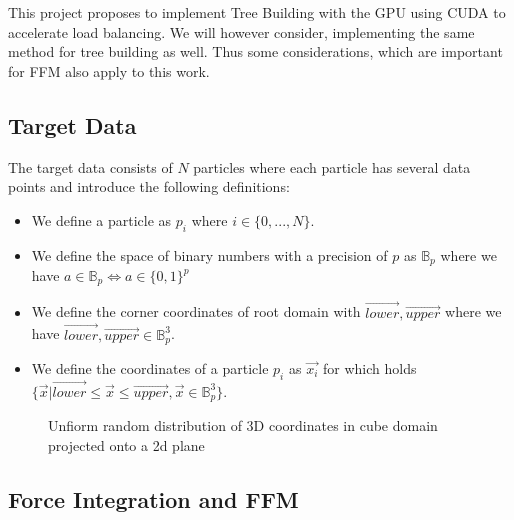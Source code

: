 \documentclass[]{article}
\begin{document}
This project proposes to implement Tree Building with the GPU using CUDA to accelerate load balancing. We will however consider, implementing the same method for tree building as well. Thus some considerations, which are important for FFM also apply to this work.

\subsection{Target Data}\label{section:target-data}


The target data consists of $N$ particles where each particle has several data points and introduce the following definitions:

\begin{itemize}
	\item We define a particle as $p_i$  where $i \in \{0,...,N\}$. 
	\item We define the space of binary numbers with a precision of $p$ as $\mathbb{B}_p$ where we have $a \in \mathbb{B}_p \Leftrightarrow a \in \{0,1\}^{p}$
	\item We define the corner coordinates of root domain with $\vec{lower}, \vec{upper}$ where we have $\vec{lower}, \vec{upper} \in \mathbb{B}_p^3$. 
	\item We define the coordinates of a particle $p_i$ as $\vec{x_i}$ for which holds $\{\vec{x} | \vec{lower} \leq \vec{x} \leq \vec{upper}, \vec{x} \in \mathbb{B}_p^3 \}$.

\end{itemize}

\begin{figure}[H]
	\begin{center}
	\end{center}
\caption{Unfiorm random distribution of 3D coordinates in cube domain projected onto a 2d plane}
\end{figure}


\subsection{Force Integration and FFM}\label{section:force-integration}
\end{document}
